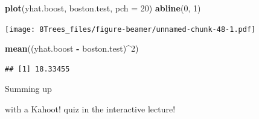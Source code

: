 \documentclass[10pt,ignorenonframetext,]{beamer}
\newenvironment{Shaded}{\begin{snugshade}}{\end{snugshade}}
\newcommand{\KeywordTok}[1]{\textcolor[rgb]{0.13,0.29,0.53}{\textbf{#1}}}
\newcommand{\DataTypeTok}[1]{\textcolor[rgb]{0.13,0.29,0.53}{#1}}
\newcommand{\DecValTok}[1]{\textcolor[rgb]{0.00,0.00,0.81}{#1}}
\newcommand{\StringTok}[1]{\textcolor[rgb]{0.31,0.60,0.02}{#1}}
\newcommand{\OperatorTok}[1]{\textcolor[rgb]{0.81,0.36,0.00}{\textbf{#1}}}
\newcommand{\NormalTok}[1]{#1}
\begin{document}
\begin{frame}[fragile]

\begin{Shaded}
\begin{Highlighting}[]
\KeywordTok{plot}\NormalTok{(yhat.boost, boston.test, }\DataTypeTok{pch =} \DecValTok{20}\NormalTok{)}
\KeywordTok{abline}\NormalTok{(}\DecValTok{0}\NormalTok{, }\DecValTok{1}\NormalTok{)}
\end{Highlighting}
\end{Shaded}

\texttt{[image: 8Trees\_files/figure-beamer/unnamed-chunk-48-1.pdf]}

\begin{Shaded}
\begin{Highlighting}[]
\KeywordTok{mean}\NormalTok{((yhat.boost }\OperatorTok{-}\StringTok{ }\NormalTok{boston.test)}\OperatorTok{^}\DecValTok{2}\NormalTok{)}
\end{Highlighting}
\end{Shaded}

\begin{verbatim}
## [1] 18.33455
\end{verbatim}

\end{frame}

\begin{frame}{Summing up }

with a Kahoot! quiz in the interactive lecture!

\end{frame}
\end{document}
